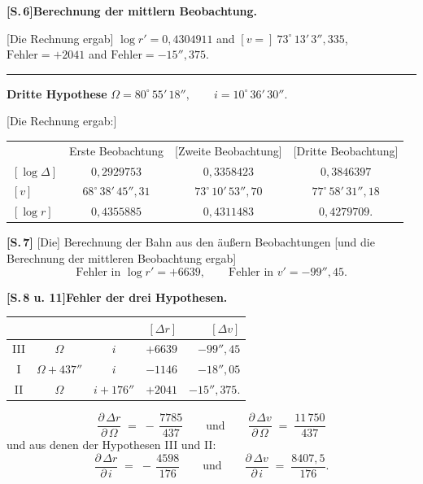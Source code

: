 \documentclass[10pt,a4paper]{article}
\begin{document}
\medskip
\noindent\textbf{[S.\,6]\quad Berechnung der mittlern Beobachtung.}
\smallskip

[Die Rechnung ergab]\hfill
$\log r' = 0{,}4304911$ \quad and \quad $[v=]~73^{\circ}\,13'\,3''{,}335$,\\
\hphantom{[Die Rechnung ergab]}\hfill
$\text{Fehler}=+2041$ \quad and \quad $\text{Fehler}=-15''{,}375$.

\medskip\hrule\medskip

\noindent\textbf{Dritte Hypothese}\hspace{2em}
$\Omega = 80^{\circ}\,55'\,18'', \qquad i = 10^{\circ}\,36'\,30''.$

[Die Rechnung ergab:]

\begin{center}
\begin{tabular}{lccc}
                & Erste Beobachtung & [Zweite Beobachtung] & [Dritte Beobachtung]\\
$[\log\Delta]$  & $0{,}2929753$ & $0{,}3358423$ & $0{,}3846397$\\
$[v]$           & $68^{\circ}\,38'\,45''\!{,}31$
                & $73^{\circ}\,10'\,53''\!{,}70$
                & $77^{\circ}\,58'\,31''\!{,}18$\\
$[\log r]$      & $0{,}4355885$ & $0{,}4311483$ & $0{,}4279709$.
\end{tabular}
\end{center}

\medskip
\noindent\textbf{[S.\,7]} [Die] Berechnung der Bahn aus den \"au\ss ern Beobachtungen
[und die Berechnung der mittleren Beobachtung ergab]
\[
\text{Fehler in } \log r' = +6639, \qquad
\text{Fehler in } v' = -99''\!\!,\!45.
\]

\medskip
\noindent\textbf{[S.\,8 u. 11]\quad Fehler der drei Hypothesen.}
\smallskip

\begin{center}
\renewcommand{\arraystretch}{1.25}
\begin{tabular}{c c c | r r}
        &                & & $[\Delta r]$ & $[\Delta v]$\\\hline
   III  & $\Omega$       & $i$         & $+6639$ & $-99''\!\!,\!45$\\
    I   & $\Omega + 437''$ & $i$         & $-1146$ & $-18''\!\!,\!05$\\
   II   & $\Omega$       & $i + 176''$ & $+2041$ & $-15''\!\!,\!375.$
\end{tabular}
\end{center}

\[
\frac{\partial\,\Delta r}{\partial\,\Omega} \;=\; -\,\frac{7785}{437}
\qquad\text{und}\qquad
\frac{\partial\,\Delta v}{\partial\,\Omega} \;=\; \frac{11\,750}{437}
\]
und aus denen der Hypothesen III und II:
\[
\frac{\partial\,\Delta r}{\partial\,i} \;=\; -\,\frac{4598}{176}
\qquad\text{und}\qquad
\frac{\partial\,\Delta v}{\partial\,i} \;=\; \frac{8407{,}5}{176}.
\]
\end{document}
